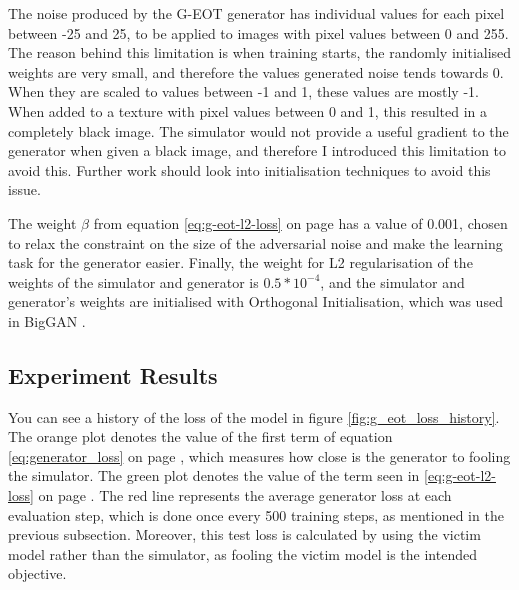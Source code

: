 The noise produced by the G-EOT generator has individual values for each pixel between -25 and 25, to be applied to images with pixel values between 0 and 255. The reason behind this limitation is when training starts, the randomly initialised weights are very small, and therefore the values generated noise tends towards 0. When they are scaled to values between -1 and 1, these values are mostly -1. When added to a texture with pixel values between 0 and 1, this resulted in a completely black image. The simulator would not provide a useful gradient to the generator when given a black image, and therefore I introduced this limitation to avoid this. Further work should look into initialisation techniques to avoid this issue.

The weight $\beta$ from equation \ref{eq:g-eot-l2-loss} on page \pageref{eq:g-eot-l2-loss} has a value of 0.001, chosen to relax the constraint on the size of the adversarial noise and make the learning task for the generator easier. Finally, the weight for L2 regularisation of the weights of the simulator and generator is $0.5 * 10^{-4}$, and the simulator and generator's weights are initialised with Orthogonal Initialisation, which was used in BigGAN \cite{big_gan}.

\subsection{Experiment Results}
    \label{sec:experiment_design}
    
You can see a history of the loss of the model in figure \ref{fig:g_eot_loss_history}. The orange plot denotes the value of the first term of equation \ref{eq:generator_loss} on page \pageref{eq:generator_loss}, which measures how close is the generator to fooling the simulator. The green plot denotes the value of the term seen in \ref{eq:g-eot-l2-loss} on page \pageref{eq:g-eot-l2-loss}. The red line represents the average generator loss at each evaluation step, which is done once every 500 training steps, as mentioned in the previous subsection. Moreover, this test loss is calculated by using the victim model rather than the simulator, as fooling the victim model is the intended objective.
    
